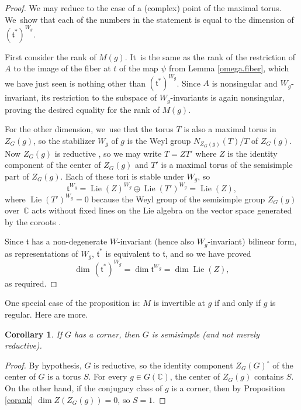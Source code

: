 \documentclass[JEP,XML,SOM,Unicode,NoFloatCountersInSection,published]{cedram}
\newtheorem{cor}[equation]{Corollary}
\theoremstyle{definition}
\let\ic\circ
\newcommand{\mft}{\mathfrak{t}}
\newcommand{\C}{\mathbb{C}}
\DeclareMathOperator{\Lie}{Lie}
\begin{document}
\begin{proof}
We may reduce to the case of a (complex) point of the maximal torus. We~show that each of the numbers in the statement is equal to the dimension of~$(\mft^*)^{W_g}$.

First consider the rank of $M(g)$. It~is the same as the rank of the restriction of $A$ to the image of the fiber at $t$ of the map $\psi$ from Lemma \ref{omega.fiber},
which we have just seen is nothing other than $(\mft^*)^{W_g}$. Since
$A$ is nonsingular and $W_g$-invariant, its restriction to the subspace of
$W_g$-invariants is again nonsingular, proving the desired equality for the rank of $M(g)$.

For the other dimension, we~use that the torus $T$ is also a maximal torus in $Z_G(g)$, so the stabilizer $W_g$ of $g$ is the Weyl group $N_{Z_G(g)}(T)/T$ of $Z_G(g)$. Now $Z_G(g)$ is reductive \cite[Prop.\,13.19]{Borel}, so we may write $T = Z T'$ where $Z$ is the identity component of the center of $Z_G(g)$ and $T'$ is a maximal torus of the semisimple part of $Z_G(g)$. Each of these tori is stable under $W_g$, so
\[
\mft^{W_g} = \Lie(Z)^{W_g} \oplus \Lie(T')^{W_g} = \Lie(Z),
\]
where $\Lie(T')^{W_g} = 0$
because the Weyl group of the semisimple group $Z_G(g)$ over~$\C$ acts without fixed lines on the Lie algebra on the vector space generated by the coroots \cite[VI.1.2, Cor.]{Bou:g4}.

Since $\mft$ has a non-degenerate $W$-invariant (hence also $W_g$-invariant) bilinear form, as representations of $W_g$, $\mft^*$ is equivalent to $\mft$, and so we have proved
\[
\dim \, (\mft^*)^{W_g} = \dim \mft^{W_g} = \dim \Lie(Z),
\]
as required.
\end{proof}

One special case of the proposition is: $M$ is invertible at $g$ if and only if $g$ is regular. Here are more.

\begin{cor} \label{corner.ss}
If $G$ has a corner, then $G$ is semisimple (and not merely reductive).
\end{cor}

\begin{proof}
By hypothesis, $G$ is reductive, so the identity component $Z_G(G)^\ic$ of the center of $G$ is a torus $S$. For every $g \in G(\C)$, the center of $Z_G(g)$ contains $S$. On the other hand, if the conjugacy class of $g$ is a corner, then by Proposition \ref{corank} $\dim Z(Z_G(g)) = 0$, so $S = 1$.
\end{proof}
\end{document}
